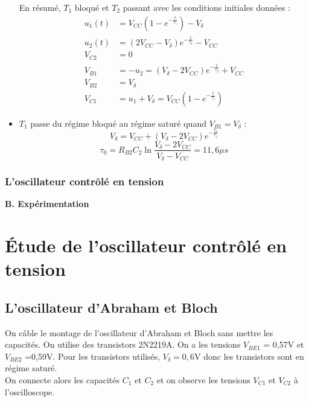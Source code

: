 \documentclass[../../Cours_M1.tex]{subfiles}
\begin{document}
\begin{itemize}
En résumé, $T_1$ bloqué et $T_2$ passant avec les conditions initiales données :
\begin{align*}
u_1(t) & = V_{CC}(1-e^{-\frac{t}{\tau_1}})-V_{\delta} \\
u_2(t) & = (2V_{CC}-V_{\delta})e^{-\frac{t}{\tau_2}} - V_{CC} \\
V_{C2} & = 0 \\
V_{B1} & = - u_2 = (V_{\delta}-2V_{CC})e^{-\frac{t}{\tau_2}} + V_{CC}\\
V_{B2} & = V_{\delta} \\
V_{C1} & = u_1 + V_{\delta} = V_{CC}(1-e^{-\frac{t}{\tau_1}})
\end{align*}

\item $T_1$ passe du régime bloqué au régime saturé quand $V_{B1} = V_{\delta}$ :
\[ V_{\delta} = V_{CC} + (V_{\delta}-2V_{CC})e^{-\frac{\tau_0}{\tau_2}} \]
\[ \boxed{\tau_0 = R_{B2}C_2 \ln \frac{V_{\delta}-2V_{CC}}{V_{\delta}-V_{CC}}} = 11,6 \mu s\]
\end{itemize}
\subsubsection{L'oscillateur contrôlé en tension}

\newpage
\begin{center}
\textbf{B. Expérimentation}
\end{center}

\setcounter{section}{0}

\section{Étude de l'oscillateur contrôlé en tension}

\subsection{L'oscillateur d'Abraham et Bloch}

On câble le montage de l'oscillateur d'Abraham et Bloch sans mettre les capacités. On utilise des transistors 2N2219A.
On a les tensions $V_{BE1}$ = 0,57V et $V_{BE2}$ =0,59V. Pour les transistors utilisés, $V_{\delta} = 0,6$V donc les transistors sont en régime saturé. \\

On connecte alors les capacités $C_1$ et $C_2$ et on observe les tensions $V_{C1}$ et $V_{C2}$ à l'oscilloscope.
\end{document}
